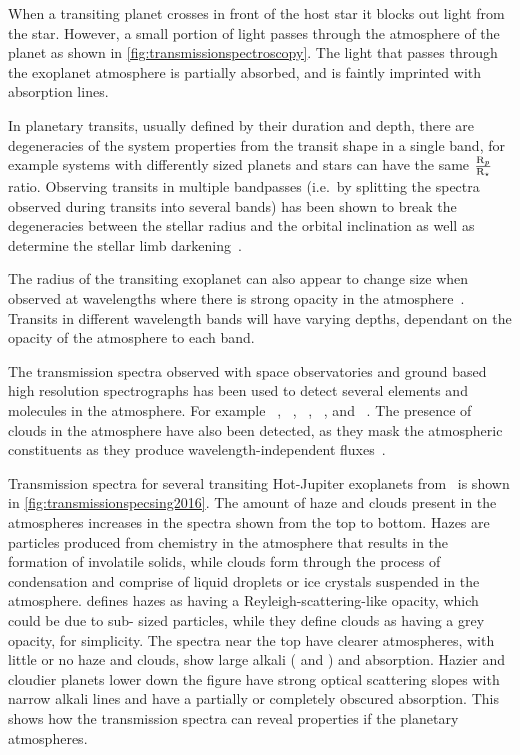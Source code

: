 When a transiting planet crosses in front of the host star it blocks out light from the star.
However, a small portion of light passes through the atmosphere of the planet as shown in \cref{fig:transmissionspectroscopy}.
The light that passes through the exoplanet atmosphere is partially absorbed, and is faintly imprinted with absorption lines.


In planetary transits, usually defined by their duration and depth, there are degeneracies of the system properties from the transit shape in a single band, for example systems with differently sized planets and stars can have the same \(\frac{\textrm{R}_{p}}{\textrm{R}_{\star}}\) ratio.
Observing transits in multiple bandpasses (i.e.\ by splitting the spectra observed during transits into several bands) has been shown to break the degeneracies between the stellar radius and the orbital inclination as well as determine the stellar limb darkening~\citep{jha_multicolor_2000, knutson_using_2007}.

The radius of the transiting exoplanet can also appear to change size when observed at wavelengths where there is strong opacity in the atmosphere~\citep[e.g.][]{burrows_radii_2000, seager_theoretical_2000}.
Transits in different wavelength bands will have varying depths, dependant on the opacity of the atmosphere to each band.

The transmission spectra observed with space observatories and ground based high resolution spectrographs has been used to detect several elements and molecules in the atmosphere.
For example ~\citep{charbonneau_detection_2002, redfield_sodium_2008, wyttenbach_spectrally_2015, nikolov_vlt_2016}, ~\citep{tinetti_water_2007, brogi_carbon_2014}, ~\citep{brogi_carbon_2014, snellen_mass_2018}, ~\citep{redfield_extrasolar_2010},  and ~\citep{hoeijmakers_atomic_2018}.
The presence of clouds in the atmosphere have also been detected, as they mask the atmospheric constituents as they produce wavelength-independent fluxes~\citep[e.g.][]{barman_clouds_2011, kreidberg_clouds_2014, sing_continuum_2016}.

Transmission spectra for several transiting Hot-Jupiter exoplanets from~\citet{sing_continuum_2016} is shown in \cref{fig:transmissionspecsing2016}.
The amount of haze and clouds present in the atmospheres increases in the spectra shown from the top to bottom.
Hazes are particles produced from chemistry in the atmosphere that results in the formation of involatile solids, while clouds form through the process of condensation and comprise of liquid droplets or ice crystals suspended in the atmosphere.
\citet{sing_continuum_2016} defines hazes as having a {Reyleigh}-scattering-like opacity, which could be due to sub-\um{} sized particles, while they define clouds as having a grey opacity, for simplicity.
The spectra near the top have clearer atmospheres, with little or no haze and clouds, show large alkali ( and ) and  absorption.
Hazier and cloudier planets lower down the figure have strong optical scattering slopes with narrow alkali lines and have a partially or completely obscured  absorption.
This shows how the transmission spectra can reveal properties if the planetary atmospheres.

